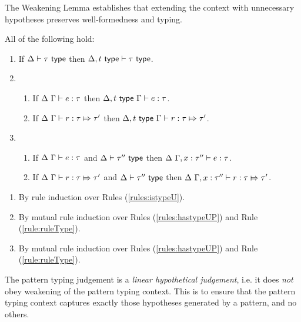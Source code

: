 {{{{The Weakening Lemma establishes that extending the context with unnecessary hypotheses preserves well-formedness and typing.
\begin{lemma}[Weakening]\label{lemma:weakening-UP} All of the following hold: 
\begin{enumerate} 
\item If $\Delta \vdash \tau~\mathsf{type}$ then $\Delta, t~\mathsf{type} \vdash \tau~\mathsf{type}$.
\item \begin{enumerate}
  \item If $\Delta~\Gamma \vdash e : \tau$ then $\Delta, t~\mathsf{type}~\Gamma \vdash e : \tau$.
  \item If $\Delta~\Gamma \vdash r : \tau \Mapsto \tau'$ then $\Delta, t~\mathsf{type}~\Gamma \vdash r : \tau \Mapsto \tau'$.
  \end{enumerate}
\item \begin{enumerate}
  \item If $\Delta~\Gamma \vdash e : \tau$ and $\Delta \vdash \tau''~\mathsf{type}$ then $\Delta~\Gamma, x : \tau'' \vdash e : \tau$.
  \item If $\Delta~\Gamma \vdash r : \tau \Mapsto \tau'$ and $\Delta \vdash \tau''~\mathsf{type}$ then $\Delta~\Gamma, x : \tau'' \vdash r : \tau \Mapsto \tau'$.
  \end{enumerate}
\end{enumerate}
\end{lemma}
\begin{proof-sketch}
\begin{enumerate}
\item By rule induction over Rules (\ref{rules:istypeU}).
\item By mutual rule induction over Rules (\ref{rules:hastypeUP}) and Rule (\ref{rule:ruleType}).
\item By mutual rule induction over Rules (\ref{rules:hastypeUP}) and Rule (\ref{rule:ruleType}).
\end{enumerate}
\end{proof-sketch}

The {pattern typing judgement} is a \emph{linear hypothetical judgement}, i.e. it does \emph{not} obey weakening of the pattern typing context. This is to ensure that the pattern typing context captures exactly those hypotheses generated by a pattern, and no others.

}}}}
